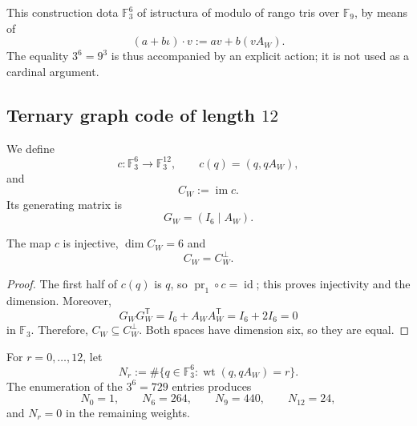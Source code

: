 This construction dota \(\mathbb F_3^6\) of istructura of modulo of rango
tris over \(\mathbb F_9\), by means of
\begin{equation}
 (a+b\iota)\cdot v:=av+b(vA_W).
 \label{p12-83-c20-s1:eq:accion-f9-sobre-f3-seis}
\end{equation}
The equality \(3^6=9^3\) is thus accompanied by an explicit action; it is not
used as a cardinal argument.

\subsection{Ternary graph code of length \(12\)}

We define
\begin{equation}
 c:\mathbb F_3^6\longrightarrow\mathbb F_3^{12},
 \qquad
 c(q)=(q,qA_W),
 \label{p12-83-c20-s1:eq:aplicacion-codigo-grafico-witt}
\end{equation}
and
\begin{equation}
 C_W:=\operatorname{im}c.
 \label{p12-83-c20-s1:eq:definicion-codigo-witt-ternario}
\end{equation}
Its generating matrix is
\[
 G_W=(I_6\mid A_W).
\]

\begin{theorem}
\label{p12-83-c20-s1:thm:cw-inyectivo-autodual}
The map \(c\) is injective, \(\dim C_W=6\) and
\begin{equation}
 \boxed{C_W=C_W^\perp.}
 \label{p12-83-c20-s1:eq:cw-autodual}
\end{equation}
\end{theorem}

\begin{proof}
The first half of \(c(q)\) is \(q\), so
\(\operatorname{pr}_1\circ c=\operatorname{id}\); this proves
injectivity and the dimension. Moreover,
\[
 G_WG_W^{\mathsf T}
 =I_6+A_WA_W^{\mathsf T}
 =I_6+2I_6=0
\]
in \(\mathbb F_3\). Therefore, \(C_W\subseteq C_W^\perp\). Both spaces
have dimension six, so they are equal.
\end{proof}

For \(r=0,\ldots,12\), let
\[
 N_r:=\#\{q\in\mathbb F_3^6:
            \operatorname{wt}(q,qA_W)=r\}.
\]
The enumeration of the \(3^6=729\) entries produces
\begin{equation}
 N_0=1,
 \qquad
 N_6=264,
 \qquad
 N_9=440,
 \qquad
 N_{12}=24,
 \label{p12-83-c20-s1:eq:censo-pesos-cw}
\end{equation}
and \(N_r=0\) in the remaining weights.

